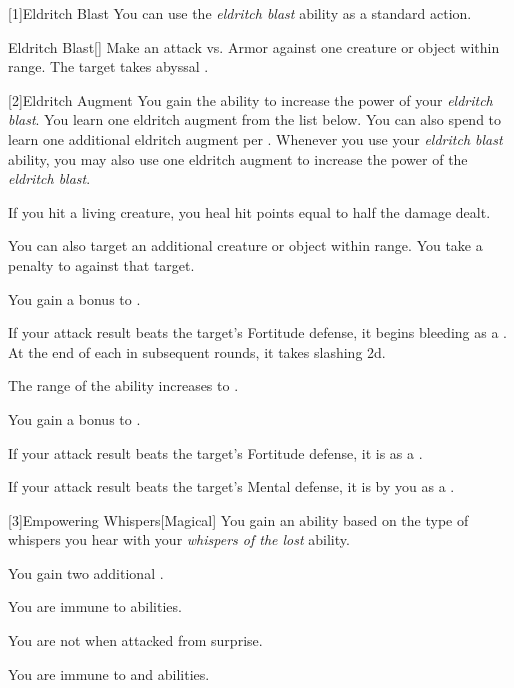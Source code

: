         [1]{Eldritch Blast} You can use the \textit{eldritch blast} ability as a standard action.
        \begin{freeability}{Eldritch Blast}[]
            Make an attack vs. Armor against one creature or object within \rngclose range.
            \hit The target takes abyssal .
        \end{freeability}

        [2]{Eldritch Augment} You gain the ability to increase the power of your \textit{eldritch blast}.
        You learn one eldritch augment from the list below.
        You can also spend  to learn one additional eldritch augment per .
        Whenever you use your \textit{eldritch blast} ability, you may also use one eldritch augment to increase the power of the \textit{eldritch blast}.
        {
             If you hit a living creature, you heal hit points equal to half the damage dealt.

             You can also target an additional creature or object within range.
            You take a  penalty to  against that target.

             You gain a  bonus to .

             If your attack result beats the target's Fortitude defense, it begins bleeding as a .
            At the end of each  in subsequent rounds, it takes slashing  \minus2d.

             The range of the ability increases to \rngmed.

             You gain a  bonus to .

             If your attack result beats the target's Fortitude defense, it is  as a .

             If your attack result beats the target's Mental defense, it is  by you as a .
        }

        [3]{Empowering Whispers}[Magical]
        You gain an ability based on the type of whispers you hear with your \textit{whispers of the lost} ability.
        {
             You gain two additional .


             You are immune to  abilities.

             You are not  when attacked from surprise.

             You are immune to  and  abilities.
        }

